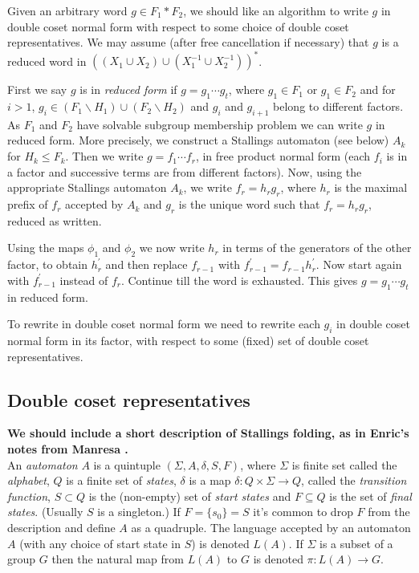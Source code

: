 \documentclass[a4paper,12pt]{article}
\renewcommand{\d}{\delta }
\renewcommand{\S}{\Sigma }
\numberwithin{equation}{section}
\numberwithin{figure}{section}
\newcommand{\maps}{\rightarrow}
\begin{document}
Given an arbitrary word $g\in F_1\ast F_2$,  
we should like an algorithm to write $g$ in double coset normal form
with respect to some choice of double coset representatives. We may 
assume (after free cancellation if necessary) that $g$ is a 
reduced word in $((X_1\cup X_2)\cup ( X_1^{-1}\cup X_2^{-1}))^\ast$.
 
First we say $g$ is in \emph{reduced form} if $g = g_1 \cdots g_t$, where
$g_1 \in F_1$ or $g_1 \in F_2$ and 
for 
$i > 1$,    $g_i \in (F_1 \backslash H_1)\cup (F_2\backslash H_2)$ and  $g_i$
and  ${g_{i+1}}$ belong to  different factors. As $F_1$ and 
$F_2$ have solvable subgroup membership problem we can write $g$ in
reduced form. More precisely, we construct a Stallings automaton 
(see below) $A_k$ for
$H_k\le F_k$. %
Then we write $g=f_1\cdots f_r$, in free product normal
form (each $f_i$ is in a factor and successive terms are 
from different factors).
Now, 
using the appropriate Stallings automaton $A_k$, we write $f_r=h_rg_r$, where
$h_r$ is the maximal prefix of $f_r$ accepted by $A_k$ and $g_r$ is
 the
unique word such that $f_r=h_rg_r$, reduced as written.

Using the maps $\phi_1$ and $\phi_2$ we now write $h_r$ in terms of the
generators of the other factor, to obtain $h^\prime_r$ and then 
replace $f_{r-1}$ with $f_{r-1}^\prime=f_{r-1}h^\prime_r$. Now start again with
$f_{r-1}^\prime$ instead of $f_r$. Continue till the word is exhausted.   
This gives $g=g_1\cdots g_t$ in reduced form.

To rewrite in double coset normal form we need to  
 rewrite
each $g_i$ in double coset normal form in its factor, 
with respect to some (fixed) set
of double coset representatives.  

\subsection{Double coset representatives}
{\bf We should include a short description of Stallings folding, as in
Enric's notes from Manresa \cite{ventura11}.} \\[1em]

An {\em automaton} $A$ is  a quintuple $(\S,A,\d,S,F)$, 
where $\S$  is finite set called the {\em alphabet}, $Q$ is a finite 
set of {\em states}, $\d$ is a map $\d:Q\times \S\maps Q$, called 
the {\em transition function}, $S\subset Q$ is the (non-empty) 
set of {\em start states} 
and 
$F\subseteq Q$ is the set of {\em final states}. (Usually $S$ is 
a singleton.) If $F=\{s_0\}=S$ it's common
to drop $F$ from the description and define $A$ as a quadruple.
The language accepted by an automaton $A$ (with any choice of start state
in $S$) is denoted $L(A)$. If $\S$ is a subset of a group $G$
 then the  natural map from $L(A)$ to
$G$ is denoted $\pi:L(A)\maps G$.
\end{document}
